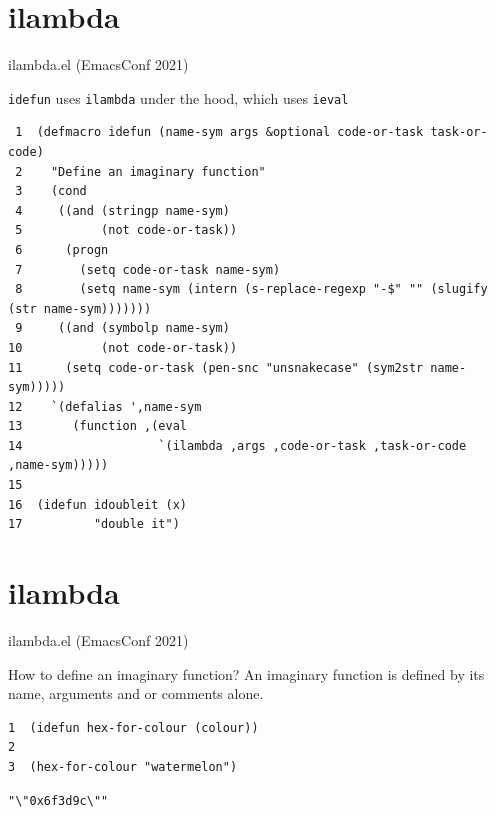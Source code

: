\documentclass[presentation]{beamer}
\begin{document}
\section{ilambda}
\label{sec:orgf51ef6c}
\begin{frame}[label={sec:org1aed471},fragile]{ilambda.el (EmacsConf 2021)}
 \begin{block}{\texttt{idefun} uses \texttt{ilambda} under the hood, which uses \texttt{ieval}}
{\tiny
\begin{verbatim}
 1  (defmacro idefun (name-sym args &optional code-or-task task-or-code)
 2    "Define an imaginary function"
 3    (cond
 4     ((and (stringp name-sym)
 5           (not code-or-task))
 6      (progn
 7        (setq code-or-task name-sym)
 8        (setq name-sym (intern (s-replace-regexp "-$" "" (slugify (str name-sym)))))))
 9     ((and (symbolp name-sym)
10           (not code-or-task))
11      (setq code-or-task (pen-snc "unsnakecase" (sym2str name-sym)))))
12    `(defalias ',name-sym
13       (function ,(eval
14                   `(ilambda ,args ,code-or-task ,task-or-code ,name-sym)))))
15  
16  (idefun idoubleit (x)
17          "double it")
\end{verbatim}
}
\end{block}
\end{frame}

\section{ilambda}
\label{sec:org8a50752}
\begin{frame}[label={sec:org97cb242},fragile]{ilambda.el (EmacsConf 2021)}
 \begin{block}{How to define an imaginary function?}
An imaginary function is defined by its name,
arguments and or comments alone.

{\tiny
\begin{verbatim}
1  (idefun hex-for-colour (colour))
2  
3  (hex-for-colour "watermelon")
\end{verbatim}
}

\begin{verbatim}
"\"0x6f3d9c\""
\end{verbatim}
\end{block}
\end{frame}
\end{document}
